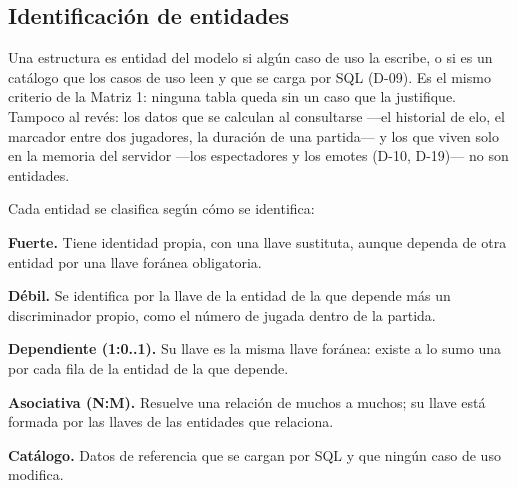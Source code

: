 \subsection*{Identificación de entidades}

Una estructura es entidad del modelo si algún caso de uso la escribe, o si es un catálogo que los casos de uso leen y que se carga por SQL (\mbox{D-09}). Es el mismo criterio de la Matriz 1: ninguna tabla queda sin un caso que la justifique. Tampoco al revés: los datos que se calculan al consultarse —el historial de elo, el marcador entre dos jugadores, la duración de una partida— y los que viven solo en la memoria del servidor —los espectadores y los emotes (\mbox{D-10}, \mbox{D-19})— no son entidades.

Cada entidad se clasifica según cómo se identifica:

\begin{reglas}
  \item \textbf{Fuerte.} Tiene identidad propia, con una llave sustituta, aunque dependa de otra entidad por una llave foránea obligatoria.
  \item \textbf{Débil.} Se identifica por la llave de la entidad de la que depende más un discriminador propio, como el número de jugada dentro de la partida.
  \item \textbf{Dependiente (1:0..1).} Su llave es la misma llave foránea: existe a lo sumo una por cada fila de la entidad de la que depende.
  \item \textbf{Asociativa (N:M).} Resuelve una relación de muchos a muchos; su llave está formada por las llaves de las entidades que relaciona.
  \item \textbf{Catálogo.} Datos de referencia que se cargan por SQL y que ningún caso de uso modifica.
\end{reglas}


